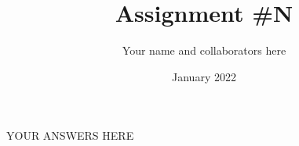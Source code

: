 \documentclass{article}
\title{Assignment \#N}
\author{Your name and collaborators here}
\date{January 2022}
\begin{document}
\maketitle
YOUR ANSWERS HERE
\newline\newline\newline\newline



\end{document}
